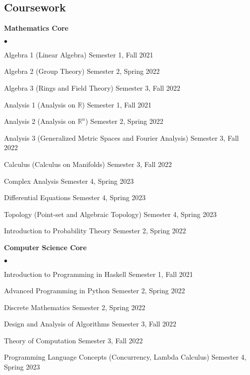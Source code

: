 \documentclass[margin,line, 10pt]{res}
\newenvironment{list2}{
  \begin{list}{$\bullet$}{%
      \setlength{\itemsep}{0in}
      \setlength{\parsep}{0in} \setlength{\parskip}{0in}
      \setlength{\topsep}{0in} \setlength{\partopsep}{0in} 
      \setlength{\leftmargin}{0.2in}}}{\end{list}}
\begin{document}
\begin{resume}
\section{\sc Coursework}

{\bf Mathematics Core}
\begin{list2}
    \item Algebra 1 (Linear Algebra) \hfill Semester 1, Fall 2021 
    \item Algebra 2 (Group Theory) \hfill Semester 2, Spring 2022
    \item Algebra 3 (Rings and Field Theory) \hfill Semester 3, Fall 2022
    \item Analysis 1 (Analysis on $\mathbb{R}$) \hfill Semester 1, Fall 2021
    \item Analysis 2 (Analysis on $\mathbb{R}^n$) \hfill Semester 2, Spring 2022
    \item Analysis 3 (Generalized Metric Spaces and Fourier Analysis) \hfill Semester 3, Fall 2022
    \item Calculus (Calculus on Manifolds) \hfill Semester 3, Fall 2022
    \item Complex Analysis \hfill Semester 4, Spring 2023
    \item Differential Equations \hfill Semester 4, Spring 2023
    \item Topology (Point-set and Algebraic Topology) \hfill Semester 4, Spring 2023
    \item Introduction to Probability Theory \hfill Semester 2, Spring 2022
\end{list2}

{\bf Computer Science Core}
\begin{list2}
    \item Introduction to Programming in Haskell \hfill Semester 1, Fall 2021
    \item Advanced Programming in Python \hfill Semester 2, Spring 2022
    \item Discrete Mathematics \hfill Semester 2, Spring 2022
    \item Design and Analysis of Algorithms \hfill Semester 3, Fall 2022
    \item Theory of Computation \hfill Semester 3, Fall 2022
    \item Programming Language Concepts (Concurrency, Lambda Calculus) \hfill Semester 4, Spring 2023
\end{list2}


\end{resume}
\end{document}
